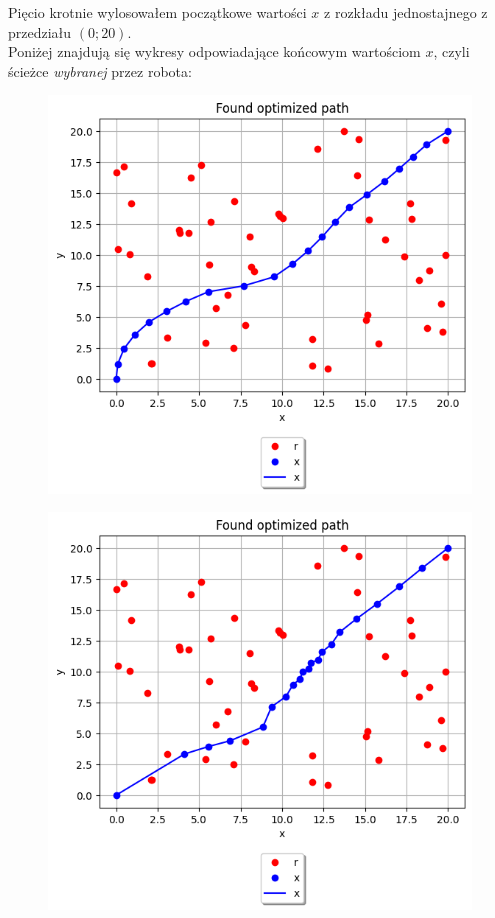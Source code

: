 \documentclass{article}
\begin{document}
\null\quad
Pięcio krotnie wylosowałem początkowe wartości $x$ z rozkładu jednostajnego z przedziału
$(0; 20)$.\\
\null\quad
Poniżej znajdują się wykresy odpowiadające końcowym wartościom $x$, czyli ścieżce 
\textit{wybranej} przez robota: \\

\begin{figure}[H]
  \includegraphics[width=\linewidth]{figures/1.png}
\end{figure}

\begin{figure}[H]
  \includegraphics[width=\linewidth]{figures/2.png}
\end{figure}
\end{document}

